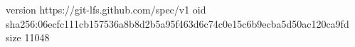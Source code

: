 version https://git-lfs.github.com/spec/v1
oid sha256:06ecfc111cb157536a8b8d2b5a95f463d6c74c0e15c6b9ecba5d50ac120ca9fd
size 11048

